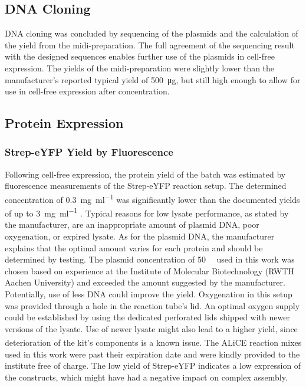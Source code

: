 \subsection{DNA Cloning}
DNA cloning was concluded by sequencing of the plasmids and the calculation of the yield from the midi-preparation. The full agreement of the sequencing result with the designed sequences enables further use of the plasmids in cell-free expression. The yields of the midi-preparation were slightly lower than the manufacturer's reported typical yield of \SI{500}{\micro\gram}, but still high enough to allow for use in cell-free expression after concentration. 

\subsection{Protein Expression}
\subsubsection{Strep-eYFP Yield by Fluorescence}
Following cell-free expression, the protein yield of the batch was estimated by fluorescence measurements of the Strep-eYFP reaction setup. The determined concentration of \SI{0.3}{\milli\gram\per\milli\litre} was significantly lower than the documented yields of up to \SI{3}{\milli\gram\per\milli\litre} \cite{alice_system}. Typical reasons for low lysate performance, as stated by the manufacturer, are an inappropriate amount of plasmid DNA, poor oxygenation, or expired lysate. As for the plasmid DNA, the manufacturer explains that the optimal amount varies for each protein and should be determined by testing. The plasmid concentration of \SI{50}{\nano\Molar} used in this work was chosen based on experience at the Institute of Molecular Biotechnology (RWTH Aachen University) and exceeded the amount suggested by the manufacturer. Potentially, use of less DNA could improve the yield. Oxygenation in this setup was provided through a hole in the reaction tube's lid. An optimal oxygen supply could be established by using the dedicated perforated lids shipped with newer versions of the lysate. Use of newer lysate might also lead to a higher yield, since deterioration of the kit's components is a known issue. The ALiCE\textsuperscript{\textregistered} reaction mixes used in this work were past their expiration date and were kindly provided to the institute free of charge. The low yield of Strep-eYFP indicates a low expression of the constructs, which might have had a negative impact on complex assembly. 




